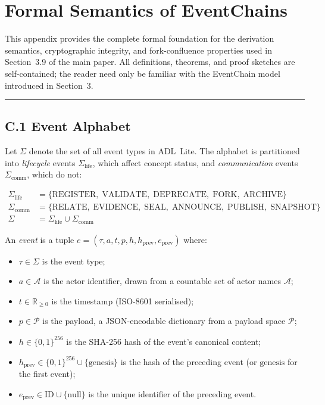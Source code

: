 \section{Formal Semantics of EventChains}\label{c.-formal-semantics-of-eventchains}

This appendix provides the complete formal foundation for the derivation semantics, cryptographic integrity, and fork-confluence properties used in Section~3.9 of the main paper. All definitions, theorems, and proof sketches are self-contained; the reader need only be familiar with the EventChain model introduced in Section~3.

\begin{center}\rule{0.5\linewidth}{0.5pt}\end{center}


\subsection{C.1 Event Alphabet}\label{c.1-event-alphabet}

Let $\Sigma$ denote the set of all event types in ADL~Lite. The alphabet is partitioned into \emph{lifecycle} events $\Sigma_{\text{life}}$, which affect concept status, and \emph{communication} events $\Sigma_{\text{comm}}$, which do not:

\begin{align}
\Sigma_{\text{life}} &= \{\text{REGISTER},\; \text{VALIDATE},\; \text{DEPRECATE},\; \text{FORK},\; \text{ARCHIVE}\} \\
\Sigma_{\text{comm}} &= \{\text{RELATE},\; \text{EVIDENCE},\; \text{SEAL},\; \text{ANNOUNCE},\; \text{PUBLISH},\; \text{SNAPSHOT}\} \\
\Sigma &= \Sigma_{\text{life}} \cup \Sigma_{\text{comm}}
\end{align}

An \emph{event} is a tuple $e = (\tau, a, t, p, h, h_{\text{prev}}, e_{\text{prev}})$ where:
\begin{itemize}
\tightlist
\item
  $\tau \in \Sigma$ is the event type;
\item
  $a \in \mathcal{A}$ is the actor identifier, drawn from a countable set of actor names $\mathcal{A}$;
\item
  $t \in \mathbb{R}_{\geq 0}$ is the timestamp (ISO-8601 serialised);
\item
  $p \in \mathcal{P}$ is the payload, a JSON-encodable dictionary from a payload space $\mathcal{P}$;
\item
  $h \in \{0,1\}^{256}$ is the SHA-256 hash of the event's canonical content;
\item
  $h_{\text{prev}} \in \{0,1\}^{256} \cup \{\text{genesis}\}$ is the hash of the preceding event (or $\text{genesis}$ for the first event);
\item
  $e_{\text{prev}} \in \text{ID} \cup \{\text{null}\}$ is the unique identifier of the preceding event.
\end{itemize}


